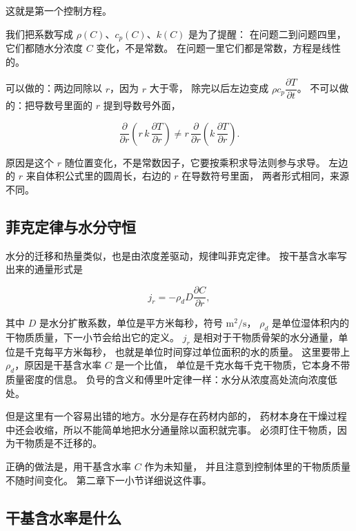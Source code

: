 这就是第一个控制方程。

我们把系数写成 $\rho(C)$、$c_p(C)$、$k(C)$ 是为了提醒：
在问题二到问题四里，它们都随水分浓度 $C$ 变化，不是常数。
在问题一里它们都是常数，方程是线性的。

可以做的：两边同除以 $r$，因为 $r$ 大于零，
除完以后左边变成 $\rho c_p\dfrac{\partial T}{\partial t}$。
不可以做的：把导数号里面的 $r$ 提到导数号外面，

\begin{equation}
\frac{\partial}{\partial r}\left(r\,k\,\frac{\partial T}{\partial r}\right)
\ne r\,\frac{\partial}{\partial r}\left(k\,\frac{\partial T}{\partial r}\right).
\end{equation}

原因是这个 $r$ 随位置变化，不是常数因子，它要按乘积求导法则参与求导。
左边的 $r$ 来自体积公式里的圆周长，右边的 $r$ 在导数符号里面，
两者形式相同，来源不同。

\subsection{菲克定律与水分守恒}

水分的迁移和热量类似，也是由浓度差驱动，规律叫菲克定律。
按干基含水率写出来的通量形式是

\begin{equation}
j_r = -\rho_d D\frac{\partial C}{\partial r},
\end{equation}

其中 $D$ 是水分扩散系数，单位是平方米每秒，符号 $\mathrm{m^2/s}$，
$\rho_d$ 是单位湿体积内的干物质质量，下一小节会给出它的定义。
$j_r$ 是相对于干物质骨架的水分通量，单位是千克每平方米每秒，
也就是单位时间穿过单位面积的水的质量。
这里要带上 $\rho_d$，原因是干基含水率 $C$ 是一个比值，
单位是千克水每千克干物质，它本身不带质量密度的信息。
负号的含义和傅里叶定律一样：水分从浓度高处流向浓度低处。

但是这里有一个容易出错的地方。水分是存在药材内部的，
药材本身在干燥过程中还会收缩，所以不能简单地把水分通量除以面积就完事。
必须盯住干物质，因为干物质是不迁移的。

正确的做法是，用干基含水率 $C$ 作为未知量，
并且注意到控制体里的干物质质量不随时间变化。
第二章下一小节详细说这件事。

\subsection{干基含水率是什么}

